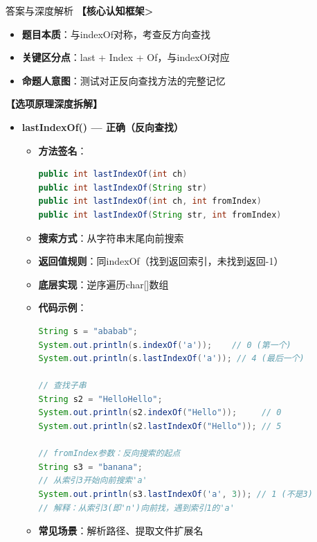 \documentclass[12pt, a4paper]{ctexart}
\begin{document}
\begin{enumerate}[label=\textbf{\arabic*.}]
\begin{bluebox}{答案与深度解析}
		      \textbf{【核心认知框架>}
		      \begin{itemize}[label={}, leftmargin=*, nosep]
			      \item \textbf{题目本质}：与indexOf对称，考查反方向查找
			      \item \textbf{关键区分点}：last + Index + Of，与indexOf对应
			      \item \textbf{命题人意图}：测试对正反向查找方法的完整记忆
		      \end{itemize}

		      \textbf{【选项原理深度拆解】}

		      \begin{itemize}[leftmargin=*, nosep, label={}]
			      \item[A] \textbf{lastIndexOf() — 正确（反向查找）}
			            \begin{itemize}[label={}, leftmargin=*, nosep]
				            \item \textbf{方法签名}：
				                  \begin{lstlisting}[language=Java]
public int lastIndexOf(int ch)
public int lastIndexOf(String str)
public int lastIndexOf(int ch, int fromIndex)
public int lastIndexOf(String str, int fromIndex)
				            \end{lstlisting}
				            \item \textbf{搜索方式}：从字符串末尾向前搜索
				            \item \textbf{返回值规则}：同indexOf（找到返回索引，未找到返回-1）
				            \item \textbf{底层实现}：逆序遍历char[]数组
				            \item \textbf{代码示例}：
				                  \begin{lstlisting}[language=Java]
String s = "ababab";
System.out.println(s.indexOf('a'));    // 0 (第一个)
System.out.println(s.lastIndexOf('a')); // 4 (最后一个)

// 查找子串
String s2 = "HelloHello";
System.out.println(s2.indexOf("Hello"));     // 0
System.out.println(s2.lastIndexOf("Hello")); // 5

// fromIndex参数：反向搜索的起点
String s3 = "banana";
// 从索引3开始向前搜索'a'
System.out.println(s3.lastIndexOf('a', 3)); // 1 (不是3)
// 解释：从索引3(即'n')向前找，遇到索引1的'a'
				            \end{lstlisting}
				            \item \textbf{常见场景}：解析路径、提取文件扩展名
			            \end{itemize}


\end{itemize}
\end{bluebox}
\end{enumerate}
\end{document}
